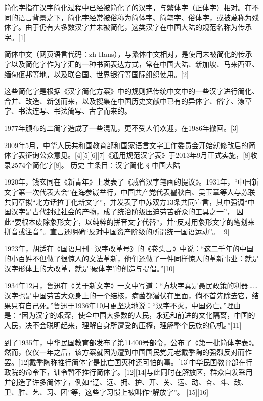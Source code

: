 


简化字指在汉字简化过程中已经被简化了的汉字，与繁体字（正体字）相对。在不同的语言背景之下，简化字经常被俗称为简体字、简笔字、俗体字，或被蔑称为残体字。由于仍有大多数汉字并未被简化，这类汉字在中国大陆的规范名称为传承字。[1]

简体中文（网页语言代码：zh-Hans），与繁体中文相对，是使用未被简化的传承字以及简化字作为字汇的一种书面表达方式，常在中国大陆、新加坡、马来西亚、缅甸佤邦等地，以及联合国、世界银行等国际组织使用。[2]

这些简化字是根据《汉字简化方案》中的规则把传统中文中的一些汉字进行简化、合并、改造、新创而来，以及搜集在中国历史文献中已有的异体字、俗字、潦草字、书法连写、书法简写、古字而来的。

1977年颁布的二简字造成了一些混乱，更不受人们欢迎，在1986年撤回。[3]

2009年5月，中华人民共和国教育部和国家语言文字工作委员会开始就修改后的简体字表征询公众意见。[4][5][6][7]《通用规范汉字表》于2013年9月正式实施，[8]收录2574个简化字[8]。
历史
主条目：汉字简化 § 中国大陆

1920年，钱玄同在《新青年》上发表了《减省汉字笔画的提议》。1931年，“中国新文字第一次代表大会”在海参崴举行，中国共产党代表瞿秋白、吴玉章等人与苏联共同草拟“北方话拉丁化新文字”，并发表了中苏双方13条共同宣言，其中强调“中国汉字是古代封建社会的产物，成了统治阶级压迫劳苦群众的工具之一”， 因此“要根本废除象形文字，以纯粹的拼音文字代替”，并“反对用象形文字的笔划来拼音或注音”。宣言还明确“反对中国资产阶级的所谓统一国语运动”。 [9]

1923年，胡适在《国语月刊·汉字改革号》的《卷头言》中说：“这二千年的中国的小百姓不但做了很惊人的文法革新，他们还做了一件同样惊人的革新事业：就是汉字形体上的大改革，就是‘破体字’的创造与提倡。”[10]

1934年12月，鲁迅在《关于新文字》一文中写道：“方块字真是愚民政策的利器……汉字也是中国劳苦大众身上的一个结核，病菌都潜伏在里面，倘不首先除去它，结果只有自己死。”鲁迅于1936年10月更坚决地说：“汉字不灭，中国必亡。”理由是：“因为汉字的艰深，使全中国大多数的人民，永远和前进的文化隔离，中国的人民，决不会聪明起来，理解自身所遭受的压榨，理解整个民族的危机。”[11]

到了1935年，中华民国教育部发布了第11400号部令，公布了《第一批简体字表》。然而，仅仅一年之后，该方案就因为遭到中国国民党元老戴季陶的强烈反对而作罢。[12]戴季陶称推行简体字是比亡国灭种还可怕的事。[13]中华民国教育部在行政院的命令下，训令暂不推行简体字。[12][14]与此同时在解放区，群众自发采用并创造了许多简体字，例如“辽、远、拥、护、开、关、运、动、奋、斗、敌、卫、胜、艺、习、团”等，这些字习惯上被叫作“解放字”。 [15][16]

